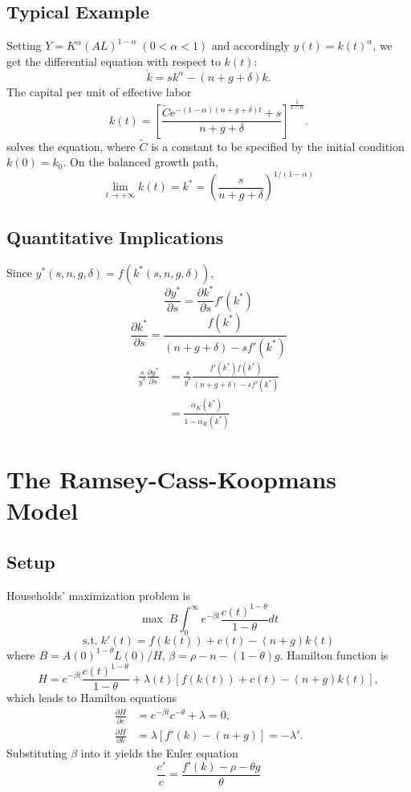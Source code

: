 \documentclass[12pt]{article} %
\newcommand{\e}{\mathrm{e}}
\begin{document}
\subsection{Typical Example}

Setting $Y=K^\alpha (AL)^{1-\alpha}\;(0<\alpha<1)$ and accordingly $y(t)=k(t)^\alpha$, we get the differential equation with respect to $k(t)$:
\[
\dot{k}=sk^\alpha-(n+g+\delta)k.
\]
The capital per unit of effective labor 
\[
k(t)=\left[\dfrac{\widetilde{C}\e^{-(1-\alpha)(n+g+\delta)t}+s}{n+g+\delta}\right]^{\tfrac{1}{1-\alpha}}.
\]
solves the equation, where $\widetilde{C}$ is a constant to be specified by the initial condition $k(0)=k_0$. On the balanced growth path, 
\[
\lim\limits_{t\rightarrow+\infty}k(t)=k^*=\left(\dfrac{s}{n+g+\delta}\right)^{1/(1-\alpha)}
\]

\subsection{Quantitative Implications}
Since $y^*(s,n,g,\delta)=f(k^*(s,n,g,\delta))$,
\[
\frac{\partial y^*}{\partial s}=\frac{\partial k^*}{\partial s}f'(k^*)
\]
\[
\frac{\partial k^*}{\partial s}=\frac{f(k^*)}{(n+g+\delta)-sf'(k^*)}
\]
\begin{align*}
\frac{s}{y^*}\frac{\partial y^*}{\partial s}&=\frac{s}{y^*}\frac{f'(k^*)f(k^*)}{(n+g+\delta)-sf'(k^*)}\\
&=\frac{\alpha_K(k^*)}{1-\alpha_K(k^*)}
\end{align*}

\newpage


\section{The Ramsey-Cass-Koopmans Model} 
\subsection{Setup} %
Households' maximization problem is 
\[
\max\; B\int_{0}^{\infty}e^{-\beta t}\frac{c(t)^{1-\theta}}{1-\theta}dt
\]
\[
\mathrm{s.t.}\;k'(t)=f(k(t))+c(t)-(n+g)k(t) 
\]
where $B=A(0)^{1-\theta}L(0)/H$, $\beta=\rho-n-(1-\theta)g$. Hamilton function is
\[
H=e^{-\beta t}\frac{c(t)^{1-\theta}}{1-\theta}+\lambda(t)[f(k(t))+c(t)-(n+g)k(t)],
\]
which leads to Hamilton equations
\begin{align*}
\frac{\partial H}{\partial c} & =e^{-\beta t}c^{-\theta}+\lambda=0,\\
\frac{\partial H}{\partial k} & =\lambda [f'(k)-(n+g)]=-\lambda'.
\end{align*}
Substituting $\beta$ into it yields the Euler equation
\[
\frac{c'}{c}=\frac{f'(k)-\rho-\theta g}{\theta}
\]
\end{document}
